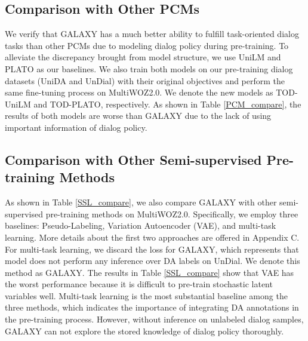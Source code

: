 \documentclass[letterpaper]{article} \usepackage{aaai22}  \usepackage{times}  \usepackage{helvet}  \usepackage{courier}  \usepackage[hyphens]{url}  \usepackage{graphicx} \urlstyle{rm} \def\UrlFont{\rm}  \usepackage{natbib}  \usepackage{caption} \DeclareCaptionStyle{ruled}{labelfont=normalfont,labelsep=colon,strut=off} \frenchspacing  \setlength{\pdfpagewidth}{8.5in}  \setlength{\pdfpageheight}{11in}  \usepackage{algorithm}
\begin{document}
\subsection{Comparison with Other PCMs}
We verify that GALAXY has a much better ability to fulfill task-oriented dialog tasks than other PCMs due to modeling dialog policy during pre-training. To alleviate the discrepancy brought from model structure, we use UniLM \cite{dong2019unified} and PLATO \cite{bao2020plato} as our baselines. We also train both models on our pre-training dialog datasets (UniDA and UnDial) with their original objectives and perform the same fine-tuning process on MultiWOZ2.0. We denote the new models as TOD-UniLM and TOD-PLATO, respectively.
As shown in Table \ref{PCM_compare}, the results of both models are worse than GALAXY due to the lack of using important information of dialog policy. 



\subsection{Comparison with Other Semi-supervised Pre-training Methods}
As shown in Table \ref{SSL_compare}, we also compare GALAXY with other semi-supervised pre-training methods on MultiWOZ2.0. Specifically, we employ three baselines: Pseudo-Labeling, Variation Autoencoder (VAE), and multi-task learning. More details about the first two approaches are offered in Appendix C. 
For multi-task learning, we discard the  loss for GALAXY, which represents that model does not perform any inference over DA labels on UnDial. We denote this method as GALAXY. The results in Table \ref{SSL_compare} show that VAE has the worst performance because it is difficult to pre-train stochastic latent variables well.
Multi-task learning is the most substantial baseline among the three methods, which indicates the importance of integrating DA annotations in the pre-training process.  However, without inference on unlabeled dialog samples, GALAXY can not explore the stored knowledge of dialog policy thoroughly.


\begin{table}[t]
\centering
{}
\caption{E2E performances of different pre-trained conversation models on MultiWOZ2.0.}
\label{PCM_compare}
\end{table}
\end{document}
